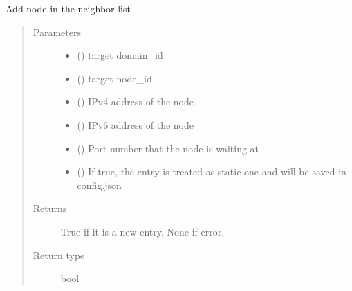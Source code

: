 \documentclass[letterpaper,10pt,english]{sphinxmanual}
\begin{document}
\begin{fulllineitems}

\begin{fulllineitems}
\label{\detokenize{bbc1.core.bbc_network:bbc1.core.bbc_network.BBcNetwork.add_neighbor}}
Add node in the neighbor list
\begin{quote}\begin{description}
\item[{Parameters}] \leavevmode\begin{itemize}
\item {} 
 () \textendash{} target domain\_id

\item {} 
 () \textendash{} target node\_id

\item {} 
 () \textendash{} IPv4 address of the node

\item {} 
 () \textendash{} IPv6 address of the node

\item {} 
 () \textendash{} Port number that the node is waiting at

\item {} 
 () \textendash{} If true, the entry is treated as static one and will be saved in config.json

\end{itemize}

\item[{Returns}] \leavevmode
True if it is a new entry, None if error.

\item[{Return type}] \leavevmode
bool

\end{description}\end{quote}


\end{fulllineitems}
\end{fulllineitems}
\end{document}
